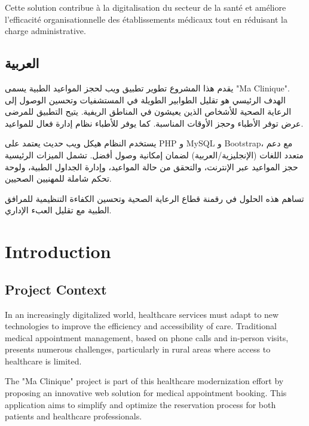 \documentclass[12pt,a4paper]{report}
\begin{document}
Cette solution contribue à la digitalisation du secteur de la santé et améliore l'efficacité organisationnelle des établissements médicaux tout en réduisant la charge administrative.

\begin{Arabic}
\section*{العربية}
يقدم هذا المشروع تطوير تطبيق ويب لحجز المواعيد الطبية يسمى "Ma Clinique". الهدف الرئيسي هو تقليل الطوابير الطويلة في المستشفيات وتحسين الوصول إلى الرعاية الصحية للأشخاص الذين يعيشون في المناطق الريفية. يتيح التطبيق للمرضى عرض توفر الأطباء وحجز الأوقات المناسبة. كما يوفر للأطباء نظام إدارة فعال للمواعيد.

يستخدم النظام هيكل ويب حديث يعتمد على PHP و MySQL و Bootstrap، مع دعم متعدد اللغات (الإنجليزية/العربية) لضمان إمكانية وصول أفضل. تشمل الميزات الرئيسية حجز المواعيد عبر الإنترنت، والتحقق من حالة المواعيد، وإدارة الجداول الطبية، ولوحة تحكم شاملة للمهنيين الصحيين.

تساهم هذه الحلول في رقمنة قطاع الرعاية الصحية وتحسين الكفاءة التنظيمية للمرافق الطبية مع تقليل العبء الإداري.
\end{Arabic}

\tableofcontents

\listoffigures

\listoftables

\newpage

\chapter{Introduction}

\section{Project Context}

In an increasingly digitalized world, healthcare services must adapt to new technologies to improve the efficiency and accessibility of care. Traditional medical appointment management, based on phone calls and in-person visits, presents numerous challenges, particularly in rural areas where access to healthcare is limited.

The "Ma Clinique" project is part of this healthcare modernization effort by proposing an innovative web solution for medical appointment booking. This application aims to simplify and optimize the reservation process for both patients and healthcare professionals.
\end{document}
